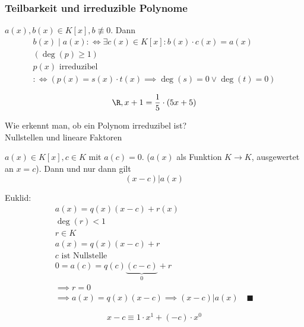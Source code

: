 \subsubsection{Teilbarkeit und irreduzible Polynome}
\begin{def*}[note = irreduzibel , index = irreduzibel]
	$a(x) , b(x) \in K[x] , b \not\equiv 0$. Dann
	\begin{gather*}
		b(x) \mid a(x) :\iff \exists c(x) \in K[x] : b(x) \cdot c(x) = a(x) \\
		(\deg(p) \geq 1) \\
		p(x) \text{ irreduzibel } \\
		:\iff ( p(x) = s(x) \cdot t(x) \implies \deg(s) = 0 \vee \deg(t) = 0 )
	\end{gather*}
\end{def*}
\begin{bsp*}
	\[ \R , x+1 = \frac{1}{5} \cdot (5x + 5) \]
\end{bsp*}

Wie erkennt man, ob ein Polynom irreduzibel ist?\\
Nullstellen und lineare Faktoren\\
\begin{satz*}
	$a(x) \in K[x] , c \in K$ mit $a(c) = 0$. ($a(x)$ als Funktion $K \rightarrow K$, ausgewertet an $x = c$). Dann und nur dann gilt
	\[(x-c) | a(x) \]
	\begin{bew}
		Euklid: 
		\begin{gather*}
			a(x) = q(x) (x-c) + r(x) \\
			\deg(r) < 1 \\
			r \in K \\
			a(x) = q(x) (x-c) + r \\
			c \text{ ist Nullstelle} \\
			0 = a(c) = q(c) \underbrace{(c-c)}_{0} + r \\
			\implies r = 0 \\
			\implies a(x) = q(x) (x-c) \implies (x-c) | a(x) \quad \blacksquare
		\end{gather*}
	\end{bew}
	\[ x-c \equiv 1 \cdot x^1 + (-c) \cdot x^0 \]
\end{satz*}

